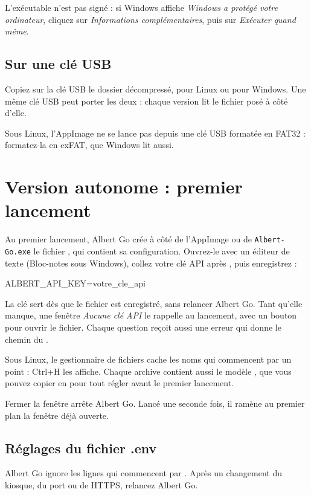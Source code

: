 \documentclass[a4paper, 11pt]{article}
\begin{document}
L'exécutable n'est pas signé : si Windows affiche \emph{Windows a protégé votre ordinateur}, cliquez sur \emph{Informations complémentaires}, puis sur \emph{Exécuter quand même}.

\subsection{Sur une clé USB}

Copiez sur la clé USB le dossier décompressé, pour Linux ou pour Windows. Une même clé USB peut porter les deux : chaque version lit le fichier  posé à côté d'elle.

Sous Linux, l'AppImage ne se lance pas depuis une clé USB formatée en FAT32 : formatez-la en exFAT, que Windows lit aussi.

\section{Version autonome : premier lancement}
\label{sec:lancement}

Au premier lancement, Albert Go crée à côté de l'AppImage ou de \texttt{Albert-Go.exe} le fichier , qui contient sa configuration. Ouvrez-le avec un éditeur de texte (Bloc-notes sous Windows), collez votre clé API après , puis enregistrez :

\begin{plain_code}
ALBERT_API_KEY=votre_cle_api
\end{plain_code}

La clé sert dès que le fichier est enregistré, sans relancer Albert Go. Tant qu'elle manque, une fenêtre \emph{Aucune clé API} le rappelle au lancement, avec un bouton pour ouvrir le fichier. Chaque question reçoit aussi une erreur qui donne le chemin du .

Sous Linux, le gestionnaire de fichiers cache les noms qui commencent par un point : Ctrl+H les affiche. Chaque archive contient aussi le modèle , que vous pouvez copier en  pour tout régler avant le premier lancement.

Fermer la fenêtre arrête Albert Go. Lancé une seconde fois, il ramène au premier plan la fenêtre déjà ouverte.

\subsection{Réglages du fichier .env}

Albert Go ignore les lignes qui commencent par \code{#}. Après un changement du kiosque, du port ou de HTTPS, relancez Albert Go.
\end{document}
